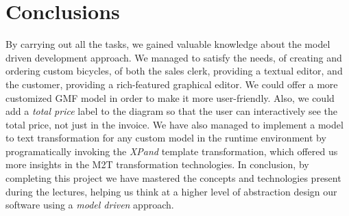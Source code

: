 \section{Conclusions}
\label{sec.conclusions}
\noindent By carrying out all the tasks, we gained valuable knowledge about the
model driven development approach. We managed to satisfy the needs, of creating
and ordering custom bicycles, of both the sales clerk, providing a textual
editor, and the customer, providing a rich-featured graphical editor. We could
offer a more customized GMF model in order to make it more user-friendly. Also,
we could add a \emph{total price} label to the diagram so that the user can
interactively see the total price, not just in the invoice. We have also managed
to implement a model to text transformation for any custom model in the runtime
environment by programatically invoking the \emph{XPand} template transformation,
which offered us more insights in the M2T transformation technologies. In
conclusion, by completing this project we have mastered the concepts and
technologies present during the lectures, helping us think at a higher level of
abstraction design our software using a \emph{model driven} approach.